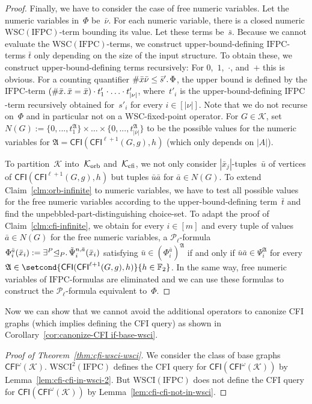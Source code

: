\documentclass[]{lmcs}
\newcommand{\FF}{\mathbb{F}}
\newcommand{\qspace}{\mathchoice{\;}{\,}{}{}}
\newcommand{\set}[1]{\lbrace #1 \rbrace}
\newcommand{\numVarA}{\nu}
\newcommand{\uniVarA}{x}
\newcommand{\termA}{s}
\newcommand{\termB}{t}
\newcommand{\formA}{\Phi}
\newcommand{\formB}{\Psi}
\newcommand{\tup}[1]{\bar{#1}}
\newcommand{\Struct}{\mathfrak{A}}
\newcommand{\vertA}{u}
\newcommand{\StructA}{\mathfrak{A}}
\newcommand{\StructVA}{A}
\newcommand{\GraphClass}{\mathcal{K}}
\newcommand{\IFPC}{\ensuremath{\mathrm{IFPC}}}
\newcommand{\CFImsym}{\mathsf{CFI}^\omega}
\newcommand{\CFIm}[1]{\CFImsym(#1)}
\newcommand{\CFImk}[2]{\mathsf{CFI}^{#1}(#2)}
\newcommand{\WSCof}[1]{\mathrm{WSC}(#1)}
\newcommand{\WSCIof}[1]{\mathrm{WSCI}(#1)}
\newcommand{\WSCIkof}[2]{\mathrm{WSCI}^{#1}(#2)}
\newcommand{\CFIsym}{\mathsf{CFI}}
\newcommand{\CFI}[1]{\CFIsym(#1)}
\newcommand{\indRel}{\trianglelefteq}
\newcommand{\Pk}[1]{\mathcal{P}_{#1}}
\newcommand{\existsP}[1]{\exists^P{#1}}
\begin{document}
\begin{proof}
	Finally, we have to consider the case of free numeric variables.
	Let the numeric variables in~$\formA$ be~$\tup{\numVarA}$.
	For each numeric variable, there is a closed numeric $\WSCof{\IFPC{}}$-term bounding its value. Let these terms be~$\tup{\termA}$.
	Because we cannot evaluate the $\WSCof{\IFPC{}}$-terms,
	we construct upper-bound-defining \IFPC{}-terms $\tup{\termB}$
	only depending on the size of the input structure.
	To obtain these, we construct upper-bound-defining terms recursively: For $0$,~$1$,~$\cdot$, and~$+$ this is obvious.
	For a counting quantifier $\#\tup{\uniVarA}\tup{\numVarA} \leq \tup{\termA}'.\qspace\formA$,
	the upper bound is defined by the \IFPC{}-term
	$(\#\tup{\uniVarA}.\qspace\tup{\uniVarA}=\tup{\uniVarA}) \cdot \termB'_1 \cdot \ldots \cdot \termB'_{|\numVarA|}$,
	where~$\termB'_i$ is the upper-bound-defining \IFPC{}-term recursively obtained for~$\termA'_i$ for every $i \in [|\numVarA|]$.
	Note that we do not recurse on~$\formA$ and in particular 
	not on a WSC-fixed-point operator.
	For $G \in \GraphClass$, set $N(G) := \set{0,...,\termB_1^\StructA} \times \dots \times \set{0,...,\termB_{|\tup{\numVarA}|}^\StructA}$ to be the possible values for
	the numeric variables for $\StructA = \CFI{\CFImk{\ell+1}{G,g},h}$ (which only depends on $|\StructVA|$).
	
	To partition~$\GraphClass$ into~$\GraphClassOrb$ and~$\GraphClassCFI$,
	we not only consider $|\tup{x}_j|$-tuples~$\tup{\vertA}$ of vertices of  $\CFI{\CFImk{\ell+1}{G,g},h}$
	but tuples $\tup{\vertA}\tup{a}$
	for $\tup{a} \in  N(G)$.
	To extend Claim~\ref{clm:orb-infinite} to numeric variables,
	we have to test all possible values for the free numeric variables
	according to the upper-bound-defining term~$\tup{\termB}$
	and find the unpebbled-part-distinguishing choice-set.
	To adapt the proof of Claim~\ref{clm:cfi-infinite},
	we obtain for every $i \in [m]$
	and every tuple of values $\tup{a} \in N(G)$ for the free numeric variables,
	a $\Pk{\ell}$-formula $
	\formA_{i}^{\tup{a}}(\tup{x}_i):= \existsP{\indRel_P}.\qspace\tilde{\formB}_{i}^{n,\tup{a}}(\tup{x}_i)$
	satisfying $\tup{\vertA} \in (\formA_{i}^{\tup{a}})^\Struct$ if and only if $\tup{\vertA}\tup{a} \in \formB_{i}^\Struct$
	for every $\Struct \in \setcond{\CFI{\CFImk{\ell+1}{G,g},h}}{h\in \FF_2}$.
	In the same way,
	free numeric variables of \IFPC{}-formulas are eliminated
	and we can use these formulas to construct the $\Pk{\ell}$-formula
	equivalent to~$\formA$.
\end{proof}

Now we can show that we cannot avoid the additional operators to canonize CFI graphs (which implies defining the CFI query) as shown in Corollary~\ref{cor:canonize-CFI if-base-wsci}.
\begin{proof}[Proof of Theorem~\ref{thm:cfi-wsci-wsci}]
	We consider the class of base graphs $\CFIm{\GraphClass}$.
	$\WSCIkof{2}{\IFPC}$ defines the CFI query for $\CFI{\CFIm{\GraphClass}}$
	by Lemma~\ref{lem:cfi-cfi-in-wsci-2}.
	But $\WSCIof{\IFPC}$ does not define the CFI query for $\CFI{\CFIm{\GraphClass}}$
	by Lemma~\ref{lem:cfi-cfi-not-in-wsci}.
\end{proof}
\end{document}
